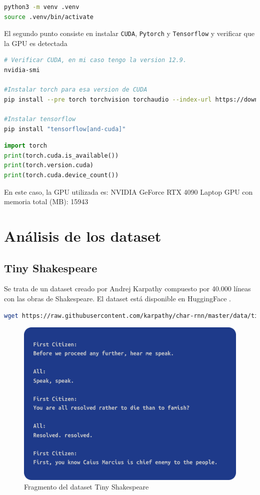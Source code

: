 \documentclass[11pt]{book}
\begin{document}
\begin{lstlisting}[language=bash]
python3 -m venv .venv
source .venv/bin/activate
\end{lstlisting}
El segundo punto consiste en instalar \texttt{CUDA}, \texttt{Pytorch} y \texttt{Tensorflow} y verificar que la GPU es detectada
\begin{lstlisting}[language=bash]
# Verificar CUDA, en mi caso tengo la version 12.9.
nvidia-smi

#Instalar torch para esa version de CUDA
pip install --pre torch torchvision torchaudio --index-url https://download.pytorch.org/whl/nightly/cu129

#Instalar tensorflow
pip install "tensorflow[and-cuda]"

\end{lstlisting}

\begin{lstlisting}[language=Python]
import torch
print(torch.cuda.is_available())
print(torch.version.cuda)
print(torch.cuda.device_count())
\end{lstlisting}
En este caso, la GPU utilizada es: NVIDIA GeForce RTX 4090 Laptop GPU con memoria total (MB): 15943

\section{Análisis de los dataset}
\subsection{Tiny Shakespeare}
Se trata de un dataset creado por Andrej Karpathy compuesto por 40.000 líneas con las obras de Shakespeare. El dataset está disponible en HuggingFace \parencite{huggingface_tinyshakespeare}.

\begin{lstlisting}[language=bash]
wget https://raw.githubusercontent.com/karpathy/char-rnn/master/data/tinyshakespeare/input.txt -O tinyshakespeare.txt
\end{lstlisting}
\begin{figure}[h]
    \centering
    \includegraphics[width=0.5\linewidth]{img/tiny_shakespeare.png}
    \caption{Fragmento del dataset Tiny Shakespeare}
    \label{fig:placeholder1}
\end{figure}
\end{document}
